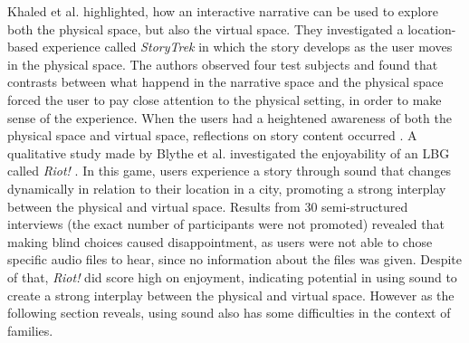 Khaled et al. highlighted, how an interactive narrative can be used to explore both the physical space, but also the virtual space. They investigated a location-based experience called \textit{StoryTrek} in which the story develops as the user moves in the physical space. The authors observed four test subjects and found that contrasts between what happend in the narrative space and the physical space forced the user to pay close attention to the physical setting, in order to make sense of the experience. When the users had a heightened awareness of both the physical space and virtual space, reflections on story content occurred \cite{StoryTrek}. A qualitative study made by Blythe et al. investigated the enjoyability of an LBG called \textit{Riot!} \cite{InterdisciplinaryCriticism}. In this game, users experience a story through sound that changes dynamically in relation to their location in a city, promoting a strong interplay between the physical and virtual space. Results from 30 semi-structured interviews (the exact number of participants were not promoted) revealed that making blind choices caused disappointment, as users were not able to chose specific audio files to hear, since no information about the files was given. Despite of that, \textit{Riot!} did score high on enjoyment, indicating potential in using sound to create a strong interplay between the physical and virtual space. However as the following section reveals, using sound also has some difficulties in the context of families.